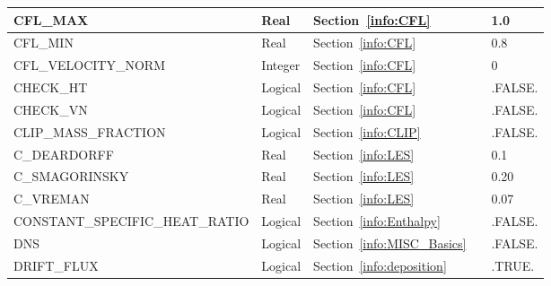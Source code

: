 \documentclass[11pt]{book}
\begin{document}
\begin{longtable}{@{\extracolsep{\fill}}|l|l|l|l|l|}
{\ct CFL\_MAX}                                  & Real          & Section~\ref{info:CFL}                                &               & 1.0               \\ \hline
{\ct CFL\_MIN}                                  & Real          & Section~\ref{info:CFL}                                &               & 0.8               \\ \hline
{\ct CFL\_VELOCITY\_NORM}                       & Integer       & Section~\ref{info:CFL}                                &               & 0                \\ \hline
{\ct CHECK\_HT}                                 & Logical       & Section~\ref{info:CFL}                                &               & {\ct .FALSE.}     \\ \hline
{\ct CHECK\_VN}                                 & Logical       & Section~\ref{info:CFL}                                &               & {\ct .FALSE.}     \\ \hline
{\ct CLIP\_MASS\_FRACTION}                      & Logical       & Section~\ref{info:CLIP}                               &               & {\ct .FALSE.}     \\ \hline
{\ct C\_DEARDORFF}                              & Real          & Section~\ref{info:LES}                                &               & 0.1               \\ \hline
{\ct C\_SMAGORINSKY}                            & Real          & Section~\ref{info:LES}                                &               & 0.20              \\ \hline
{\ct C\_VREMAN}                                 & Real          & Section~\ref{info:LES}                                &               & 0.07              \\ \hline
{\ct CONSTANT\_SPECIFIC\_HEAT\_RATIO}           & Logical       & Section~\ref{info:Enthalpy}                           &               & {\ct .FALSE.}    \\ \hline
{\ct DNS}                                       & Logical       & Section~\ref{info:MISC_Basics}                        &               & {\ct .FALSE.}     \\ \hline
{\ct DRIFT\_FLUX}                               & Logical       & Section~\ref{info:deposition}                         &               & {\ct .TRUE.}     \\ \hline

\end{longtable}
\end{document}
